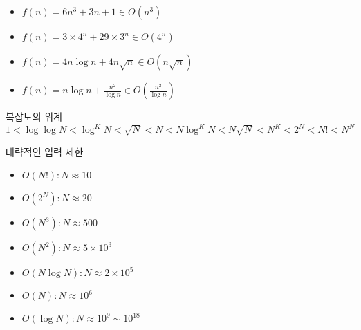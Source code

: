 \begin{frame}{\textbf{\currentname}}
    \begin{example}
        \begin{itemize}
            \item $f(n)=6n^{3}+3n+1 \in O(n^{3})$
            \item $f(n)=3\times 4^{n}+29\times 3^{n} \in O(4^{n})$
            \item $f(n)=4n\log{n}+4n\sqrt{n} \in O(n\sqrt{n})$
            \item $f(n)=n\log{n}+\frac{n^2}{\log{n}} \in O\left(\frac{n^{2}}{\log{n}}\right)$
        \end{itemize}
    \end{example}
\end{frame}

\begin{frame}{\textbf{\currentname}}
    \vspace{0.5cm}
    
    \begin{block}{복잡도의 위계}
        $1<\log\log{N}<\log^{K}{N}<\sqrt{N}<N<N\log^{K}N<N\sqrt{N}<N^{K}<2^{N}<N!<N^{N}$
    \end{block}

    \begin{block}{대략적인 입력 제한}
        \begin{itemize}
            \item $O(N!) : N\approx 10$
            \item $O(2^{N}) : N\approx 20$
            \item $O(N^3) : N\approx 500$
            \item $O(N^2) : N\approx 5\times 10^{3}$
            \item $O(N\log{N}) : N\approx 2\times 10^{5}$
            \item $O(N) : N\approx 10^{6}$
            \item $O(\log{N}) : N\approx 10^{9}\sim 10^{18}$
        \end{itemize}
    \end{block}
\end{frame}